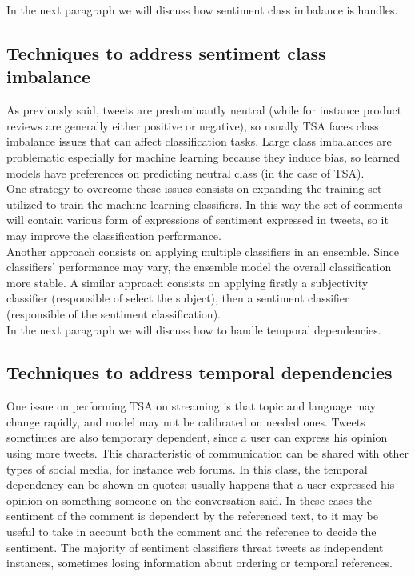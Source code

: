 In the next paragraph we will discuss how sentiment class imbalance is handles.\\


\subsection{Techniques to address sentiment class imbalance}
As previously said, tweets are predominantly neutral (while for instance product reviews are generally either positive or negative), so usually \ac{TSA} faces class imbalance issues that can affect classification tasks. Large class imbalances are problematic especially for machine learning because they induce bias, so learned models have preferences on predicting neutral class (in the case of \ac{TSA}).\\
One strategy to overcome these issues consists on expanding the training set utilized to train the machine-learning classifiers. In this way the set of comments will contain various form of expressions of sentiment expressed in tweets, so it may improve the classification performance.\\
Another approach consists on applying multiple classifiers in an ensemble. Since classifiers' performance may vary, the ensemble model the overall classification more stable. A similar approach consists on applying firstly a subjectivity classifier (responsible of select the subject), then a sentiment classifier (responsible of the sentiment classification).\\

In the next paragraph we will discuss how to handle temporal dependencies.


\subsection{Techniques to address temporal dependencies}
One issue on performing \ac{TSA} on streaming is that topic and language may change rapidly, and model may not be calibrated on needed ones. Tweets sometimes are also temporary dependent, since a user can express his opinion using more tweets. This characteristic of communication can be shared with other types of social media, for instance web forums. In this class, the temporal dependency can be shown on quotes: usually happens that a user expressed his opinion on something someone on the conversation said. In these cases the sentiment of the comment is dependent by the referenced text, to it may be useful to take in account both the comment and the reference to decide the sentiment. The majority of sentiment classifiers threat tweets as independent instances, sometimes losing information about ordering or temporal references.



